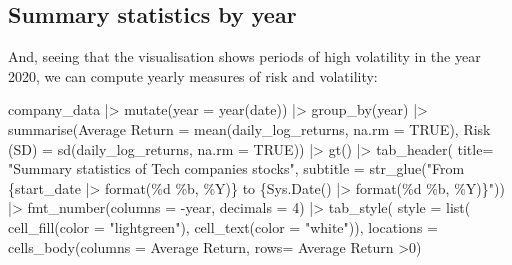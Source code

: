 \documentclass[
  12pt]{article}
\newenvironment{Shaded}{\begin{snugshade}}{\end{snugshade}}
\newcommand{\AttributeTok}[1]{\textcolor[rgb]{0.40,0.45,0.13}{#1}}
\newcommand{\ConstantTok}[1]{\textcolor[rgb]{0.56,0.35,0.01}{#1}}
\newcommand{\DecValTok}[1]{\textcolor[rgb]{0.68,0.00,0.00}{#1}}
\newcommand{\FunctionTok}[1]{\textcolor[rgb]{0.28,0.35,0.67}{#1}}
\newcommand{\NormalTok}[1]{\textcolor[rgb]{0.00,0.23,0.31}{#1}}
\newcommand{\OtherTok}[1]{\textcolor[rgb]{0.00,0.23,0.31}{#1}}
\newcommand{\SpecialCharTok}[1]{\textcolor[rgb]{0.37,0.37,0.37}{#1}}
\newcommand{\StringTok}[1]{\textcolor[rgb]{0.13,0.47,0.30}{#1}}
\theoremstyle{definition}
\theoremstyle{remark}
\begin{document}
\subsection{Summary statistics by
year}\label{summary-statistics-by-year}

And, seeing that the visualisation shows periods of high volatility in
the year 2020, we can compute yearly measures of risk and volatility:

\begin{Shaded}
\begin{Highlighting}[]
\NormalTok{company\_data }\SpecialCharTok{|\textgreater{}} 
  \FunctionTok{mutate}\NormalTok{(}\AttributeTok{year =} \FunctionTok{year}\NormalTok{(date)) }\SpecialCharTok{|\textgreater{}} 
  \FunctionTok{group\_by}\NormalTok{(year) }\SpecialCharTok{|\textgreater{}} 
  \FunctionTok{summarise}\NormalTok{(}\StringTok{\textasciigrave{}}\AttributeTok{Average Return}\StringTok{\textasciigrave{}} \OtherTok{=} \FunctionTok{mean}\NormalTok{(daily\_log\_returns, }\AttributeTok{na.rm =} \ConstantTok{TRUE}\NormalTok{), }
            \StringTok{\textasciigrave{}}\AttributeTok{Risk (SD)}\StringTok{\textasciigrave{}} \OtherTok{=} \FunctionTok{sd}\NormalTok{(daily\_log\_returns, }\AttributeTok{na.rm =} \ConstantTok{TRUE}\NormalTok{)) }\SpecialCharTok{|\textgreater{}} 
  \FunctionTok{gt}\NormalTok{() }\SpecialCharTok{|\textgreater{}} 
  \FunctionTok{tab\_header}\NormalTok{(}
    \AttributeTok{title=} \StringTok{"Summary statistics of Tech companies stocks"}\NormalTok{,}
    \AttributeTok{subtitle  =} \FunctionTok{str\_glue}\NormalTok{(}\StringTok{"From \{start\_date |\textgreater{} format(\textquotesingle{}\%d \%b, \%Y\textquotesingle{})\} to \{Sys.Date() |\textgreater{} format(\textquotesingle{}\%d \%b, \%Y\textquotesingle{})\}"}\NormalTok{)) }\SpecialCharTok{|\textgreater{}} 
  \FunctionTok{fmt\_number}\NormalTok{(}\AttributeTok{columns =} \SpecialCharTok{{-}}\NormalTok{year, }\AttributeTok{decimals  =} \DecValTok{4}\NormalTok{) }\SpecialCharTok{|\textgreater{}} 
  \FunctionTok{tab\_style}\NormalTok{(}
    \AttributeTok{style =} \FunctionTok{list}\NormalTok{(}
      \FunctionTok{cell\_fill}\NormalTok{(}\AttributeTok{color =} \StringTok{"lightgreen"}\NormalTok{), }
      \FunctionTok{cell\_text}\NormalTok{(}\AttributeTok{color =} \StringTok{"white"}\NormalTok{)), }
    \AttributeTok{locations =} 
      \FunctionTok{cells\_body}\NormalTok{(}\AttributeTok{columns =} \StringTok{\textasciigrave{}}\AttributeTok{Average Return}\StringTok{\textasciigrave{}}\NormalTok{, }
                 \AttributeTok{rows=} \StringTok{\textasciigrave{}}\AttributeTok{Average Return}\StringTok{\textasciigrave{}} \SpecialCharTok{\textgreater{}}\DecValTok{0}\NormalTok{)}

\end{Highlighting}
\end{Shaded}
\end{document}
